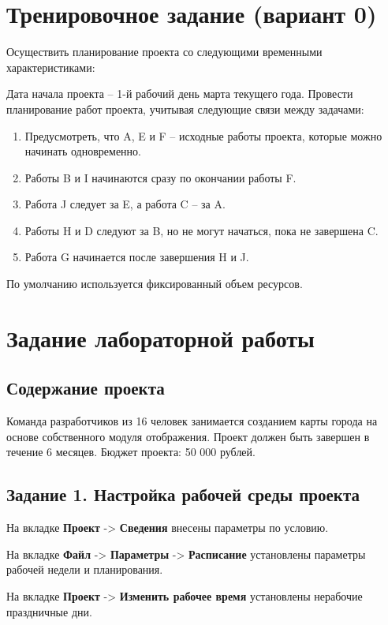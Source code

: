 \chapter{Тренировочное задание (вариант 0)}
Осуществить планирование проекта со следующими временными характеристиками:

Дата начала проекта – 1-й рабочий день марта текущего года. Провести планирование работ проекта, учитывая следующие связи между задачами:
\begin{enumerate}
    \item Предусмотреть, что A, E и F – исходные работы проекта, которые можно начинать одновременно.
    \item Работы B и I начинаются сразу по окончании работы F.
    \item Работа J следует за E, а работа C – за A.
    \item Работы H и D следуют за B, но не могут начаться, пока не завершена C.
    \item Работа G начинается после завершения H и J.
\end{enumerate}
По умолчанию используется фиксированный объем ресурсов.
\chapter{Задание лабораторной работы}
\section*{Содержание проекта}
Команда разработчиков из 16 человек занимается созданием карты города на основе собственного модуля отображения. Проект должен быть завершен в течение 6 месяцев. Бюджет проекта: 50 000 рублей.
\section*{Задание 1. Настройка рабочей среды проекта}
На вкладке \textbf{Проект} -> \textbf{Сведения} внесены параметры по условию.

На вкладке \textbf{Файл} -> \textbf{Параметры} -> \textbf{Расписание} установлены параметры рабочей недели и планирования.

На вкладке \textbf{Проект} -> \textbf{Изменить рабочее время} установлены нерабочие праздничные дни.

